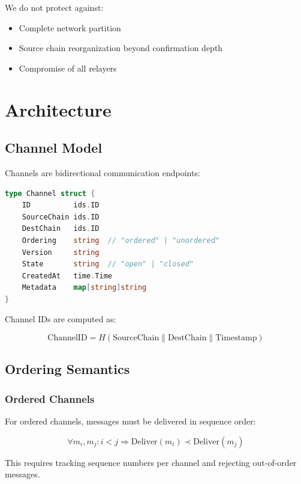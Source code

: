 \documentclass[11pt,twocolumn]{article}
\begin{document}
We do not protect against:
\begin{itemize}
\item Complete network partition
\item Source chain reorganization beyond confirmation depth
\item Compromise of all relayers
\end{itemize}

\section{Architecture}

\subsection{Channel Model}

Channels are bidirectional communication endpoints:

\begin{lstlisting}[language=Go,basicstyle=\ttfamily\small]
type Channel struct {
    ID          ids.ID
    SourceChain ids.ID
    DestChain   ids.ID
    Ordering    string  // "ordered" | "unordered"
    Version     string
    State       string  // "open" | "closed"
    CreatedAt   time.Time
    Metadata    map[string]string
}
\end{lstlisting}

Channel IDs are computed as:

\begin{equation}
\text{ChannelID} = H(\text{SourceChain} \| \text{DestChain} \| \text{Timestamp})
\end{equation}

\subsection{Ordering Semantics}

\subsubsection{Ordered Channels}

For ordered channels, messages must be delivered in sequence order:

\begin{equation}
\forall m_i, m_j : i < j \Rightarrow \text{Deliver}(m_i) \prec \text{Deliver}(m_j)
\end{equation}

This requires tracking sequence numbers per channel and rejecting out-of-order messages.
\end{document}
